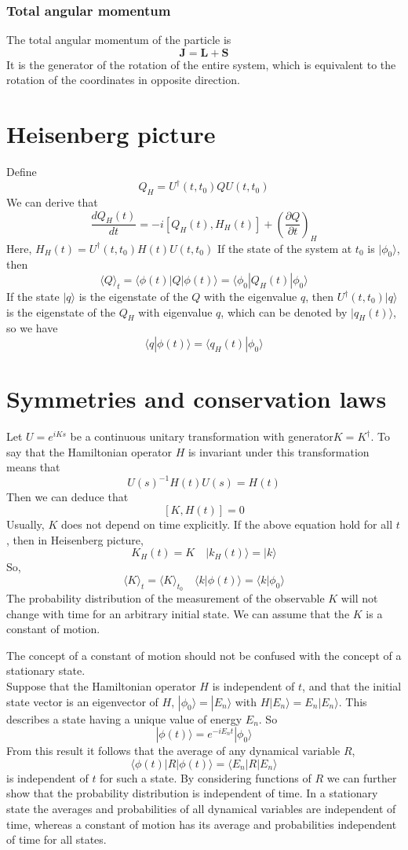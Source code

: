 \subsubsection{Total angular momentum}
\noindent
The total angular momentum of the particle is 
\[\bm{J} = \bm{L} + \bm{S}\]
It is the generator of the rotation of the entire system, which is equivalent to the rotation of the coordinates in opposite direction.

\section{Heisenberg picture}
\noindent
Define
\[Q_H = U^{\dagger}(t,t_0)QU(t,t_0)\]
We can derive that
\[\frac{dQ_H(t)}{dt} = -i[Q_H(t),H_H(t)] + \left(\frac{\partial Q}{\partial t}\right)_H \]
Here, $H_H(t) = U^{\dagger}(t,t_0) H(t) U(t,t_0)$
If the state of the system at $t_0$ is $|\phi_0\rangle$, then
\[\langle Q \rangle_t = \langle \phi(t) | Q | \phi(t) \rangle = \langle \phi_0 | Q_H(t) | \phi_0 \rangle\]
If the state $|q\rangle$ is the eigenstate of the $Q$ with the eigenvalue $q$, then $U^{\dagger}(t,t_0)|q\rangle$ is the eigenstate of the $Q_H$ with eigenvalue $q$, which can be denoted by $|q_H(t)\rangle$, so we have
\[\langle q | \phi(t) \rangle = \langle q_H(t) | \phi_0 \rangle\]

\section{Symmetries and conservation laws}
\noindent
Let $U = e^{iKs}$ be a continuous unitary transformation with generator$K=K^{\dagger}$. To say that the Hamiltonian
operator $H$ is invariant under this transformation means that
\[U(s)^{-1} H(t) U(s) = H(t)\]
Then we can deduce that
\[[K,H(t)] = 0\]
Usually, $K$ does not depend on time explicitly. If the above equation hold for all $t$, then in Heisenberg picture, 
\[K_H(t) = K \quad |k_H(t) \rangle = | k \rangle\]
So, 
\[\langle K \rangle_t = \langle K \rangle_{t_0} \quad \langle k | \phi(t) \rangle = \langle k | \phi_0 \rangle\]
The probability distribution of the measurement of the observable $K$ will not change with time for an arbitrary initial state. We can assume that the $K$ is a constant of motion.

\begin{note}
The concept of a constant of motion should not be confused with the
concept of a stationary state. \\
Suppose that the Hamiltonian operator $H$ is independent of $t$, and that the initial state vector is an eigenvector of $H$, $|\phi_0\rangle = | E_n \rangle$ with $H |E_n\rangle = E_n | E_n \rangle$. This describes a state having a unique value of energy $E_n$. So
\[|\phi(t)\rangle = e^{-iE_nt} |\phi_0\rangle\]
From this result it follows that the average of any dynamical variable $R$,
\[\langle \phi(t) | R | \phi(t) \rangle = \langle E_n | R | E_n \rangle\]
is independent of $t$ for such a state. By considering functions of $R$ we can further show that the probability distribution is independent of time. In a stationary state the averages and probabilities of all dynamical variables are independent of time, whereas a constant of motion has its average and probabilities independent of time for all states.
\end{note}
